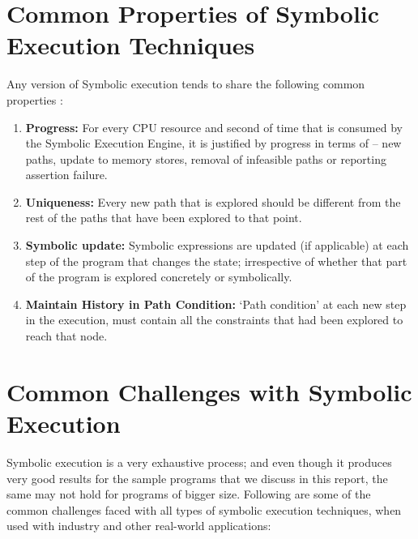 \documentclass[11pt]{llncs}
\begin{document}
\section{Common Properties of Symbolic Execution Techniques }
	Any version of Symbolic execution tends to share the following common properties \cite{2_Survey_SE}:
	\begin{enumerate}
		\item \textbf{Progress:} For every CPU resource and second of time that is consumed by the Symbolic Execution Engine, it is justified by progress in terms of – new paths, update to memory stores, removal of infeasible paths or reporting assertion failure. \cite{2_Survey_SE}

		\vspace{2mm}

		\item \textbf{Uniqueness:} Every new path that is explored should be different from the rest of the paths that have been explored to that point.

		\vspace{2mm}

		\item \textbf{Symbolic update:}  Symbolic expressions are updated (if applicable) at each step of the program that changes the state; irrespective of whether that part of the program is explored concretely or symbolically.

		\vspace{2mm}

		\item \textbf{Maintain History in Path Condition:} ‘Path condition’ at each new step in the execution, must contain all the constraints that had been explored to reach that node.
	\end{enumerate}



\section{Common Challenges with Symbolic Execution}
	Symbolic execution is a very exhaustive process; and even though it produces very good results for the sample programs that we discuss in this report, the same may not hold for programs of bigger size. Following are some of the common challenges faced with all types of symbolic execution techniques, when used with industry and other real-world applications:

    \vspace{-1mm}
    
\end{document}
